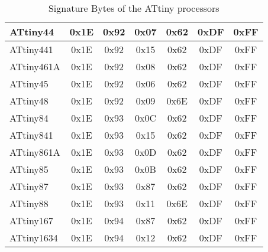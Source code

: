 \begin{table}[H]
\begin{center}
\begin{tabular}{| l | c | c | c || c | c | c |}
    \hline
ATtiny44   & 0x1E & 0x92  & 0x07 & 0x62 & 0xDF & 0xFF \\
    \hline
ATtiny441  & 0x1E & 0x92  & 0x15 & 0x62 & 0xDF & 0xFF \\
    \hline
ATtiny461A & 0x1E & 0x92  & 0x08 & 0x62 & 0xDF & 0xFF \\
    \hline
ATtiny45   & 0x1E & 0x92  & 0x06 & 0x62 & 0xDF & 0xFF \\
    \hline
ATtiny48   & 0x1E & 0x92  & 0x09 & 0x6E & 0xDF & 0xFF \\
    \hline
ATtiny84   & 0x1E & 0x93  & 0x0C & 0x62 & 0xDF & 0xFF \\
    \hline
ATtiny841  & 0x1E & 0x93  & 0x15 & 0x62 & 0xDF & 0xFF \\
    \hline
ATtiny861A & 0x1E & 0x93  & 0x0D & 0x62 & 0xDF & 0xFF \\
    \hline
ATtiny85   & 0x1E & 0x93  & 0x0B & 0x62 & 0xDF & 0xFF \\
    \hline
ATtiny87   & 0x1E & 0x93  & 0x87 & 0x62 & 0xDF & 0xFF \\
    \hline
ATtiny88   & 0x1E & 0x93  & 0x11 & 0x6E & 0xDF & 0xFF \\
    \hline
ATtiny167  & 0x1E & 0x94  & 0x87 & 0x62 & 0xDF & 0xFF \\
    \hline
ATtiny1634 & 0x1E & 0x94  & 0x12 & 0x62 & 0xDF & 0xFF \\
    \hline
    \end{tabular}
  \end{center}
  \caption{Signature Bytes of the ATtiny processors}
  \label{tab:tinySignature}
\end{table}


